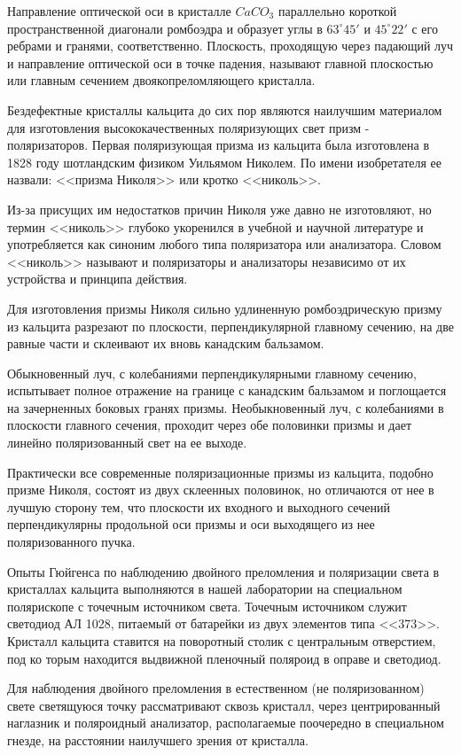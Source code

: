 Направление оптической оси в кристалле $CaCO_3$ параллельно короткой пространственной диагонали ромбоэдра и образует углы в $63^\circ45'$ и $45^\circ22'$ с его ребрами и гранями, соответственно.
Плоскость, проходящую через падающий луч и направление оптической оси в точке падения, называют главной плоскостью или
главным сечением двоякопреломляющего кристалла.

Бездефектные кристаллы кальцита до сих пор являются наилучшим материалом для изготовления высококачественных поляризующих
свет призм - поляризаторов. Первая поляризующая призма из кальцита была изготовлена в 1828 году шотландским физиком Уильямом
Николем. По имени изобретателя ее назвали: <<призма Николя>> или
кротко <<николь>>. 

Из-за присущих им недостатков причин Николя уже
давно не изготовляют, но термин <<николь>> глубоко укоренился в
учебной и научной литературе и употребляется как синоним любого
типа поляризатора или анализатора. Словом <<николь>> называют и
поляризаторы и анализаторы независимо от их устройства и принципа действия.

Для изготовления призмы Николя сильно удлиненную ромбоэдрическую призму из кальцита разрезают по плоскости, перпендикулярной главному сечению, на две равные части и склеивают их вновь канадским бальзамом.

Обыкновенный луч, с колебаниями перпендикулярными главному сечению,
испытывает полное отражение на границе с канадским бальзамом и
поглощается на зачерненных боковых гранях призмы. Необыкновенный
луч, с колебаниями в плоскости главного сечения, проходит через
обе половинки призмы и дает линейно поляризованный свет на ее
выходе.

Практически все современные поляризационные призмы из каль­цита, подобно призме Николя, состоят из двух склеенных половинок,
но отличаются от нее в лучшую сторону тем, что плоскости их входного и выходного сечений перпендикулярны продольной оси призмы
и оси выходящего из нее поляризованного пучка.

Опыты Гюйгенса по наблюдению двойного преломления и поляризации света в кристаллах кальцита выполняются в нашей лаборатории на специальном полярископе с точечным источником
света. Точечным источником служит светодиод АЛ 1028, питаемый
от батарейки из двух элементов типа <<373>>. Кристалл кальцита
ставится на поворотный столик с центральным отверстием, под ко­
торым находится выдвижной пленочный поляроид в оправе и свето­диод.

Для наблюдения двойного преломления в естественном (не поляризованном) свете светящуюся точку рассматривают сквозь
кристалл, через центрированный наглазник и поляроидный анализатор, располагаемые поочередно в специальном гнезде,
на расстоянии наилучшего зрения от кристалла.

